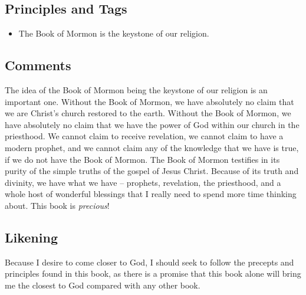 \documentclass[12pt]{report}
\begin{document}
\subsection{Principles and Tags\label{intro:principles6}}
\begin{itemize}
\item {}The Book of Mormon is the keystone of our religion.
\end{itemize}

\subsection{Comments\label{intro:comments6}}
The idea of the Book of Mormon being the keystone of our religion is an important one.  Without the Book of Mormon, we have absolutely no claim that we are Christ's church restored to the earth.  Without the Book of Mormon, we have absolutely no claim that we have the power of God within our church in the priesthood.  We cannot claim to receive revelation, we cannot claim to have a modern prophet, and we cannot claim any of the knowledge that we have is true, if we do not have the Book of Mormon.  The Book of Mormon testifies in its purity of the simple truths of the gospel of Jesus Christ.  Because of its truth and divinity, we have what we have -- prophets, revelation, the priesthood, and a whole host of wonderful blessings that I really need to spend more time thinking about.  This book is \emph{precious}!

\subsection{Likening\label{intro:likening6}}
Because I desire to come closer to God, I should seek to follow the precepts and principles found in this book, as there is a promise that this book alone will bring me the closest to God compared with any other book.
\end{document}
